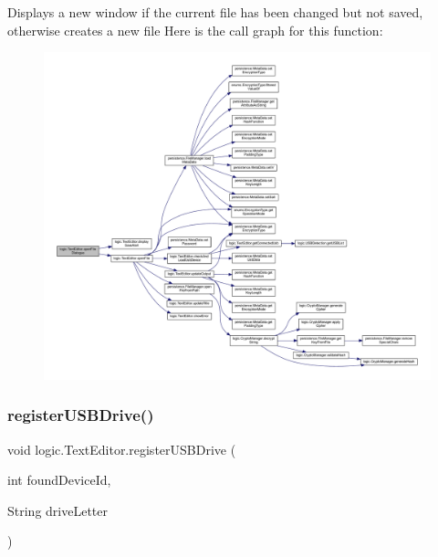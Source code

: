 Displays a new window if the current file has been changed but not saved, otherwise creates a new file Here is the call graph for this function\+:\nopagebreak
\begin{figure}[H]
\begin{center}
\leavevmode
\includegraphics[width=350pt]{classlogic_1_1_text_editor_ae6690cbd84b9162df386bb319690a810_cgraph}
\end{center}
\end{figure}
\mbox{\label{classlogic_1_1_text_editor_aeb8b26927002020f35d2dc6cc8ececfe}} 
\subsubsection{\texorpdfstring{register\+U\+S\+B\+Drive()}{registerUSBDrive()}}
{\footnotesize\ttfamily void logic.\+Text\+Editor.\+register\+U\+S\+B\+Drive (\begin{DoxyParamCaption}\item[{int}]{found\+Device\+Id,  }\item[{String}]{drive\+Letter }\end{DoxyParamCaption})}

